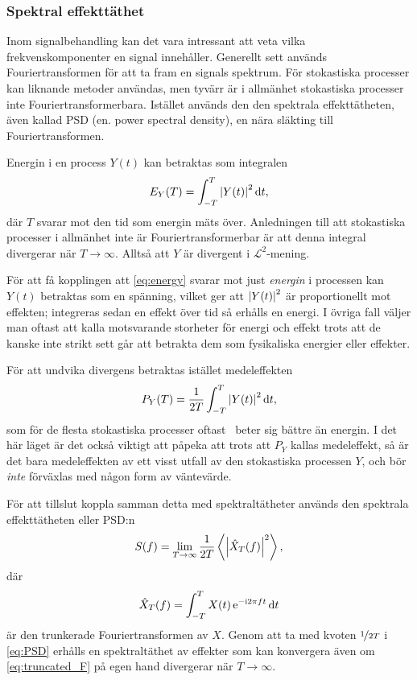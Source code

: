 \subsubsection{Spektral effekttäthet}
Inom signalbehandling kan det vara intressant att veta vilka frekvenskomponenter en signal innehåller. Generellt sett används Fouriertransformen för att ta fram en signals spektrum.
För stokastiska processer kan liknande metoder användas, men tyvärr är i allmänhet stokastiska processer inte Fouriertransformerbara. Istället används den den spektrala effekttätheten, även kallad PSD (en. power spectral density), en nära släkting till Fouriertransformen.

Energin i en process $Y(t)$ kan betraktas som integralen
\begin{equation}\label{eq:energy}
E_Y(T) = \int_{-T}^{T} \abs{Y(t)}^2\,\mathrm{d}{t},
\end{equation}
där $T$ svarar mot den tid som energin mäts över. Anledningen till att stokastiska processer i allmänhet inte är Fouriertransformerbar är att denna integral divergerar när $T\to\infty$. Alltså att $Y$ är divergent i $\mathcal{L}^2$-mening. 

För att få kopplingen att \eqref{eq:energy} svarar mot just \emph{energin} i processen kan $Y(t)$ betraktas som en spänning, vilket ger att $\abs{Y(t)}^2$ är proportionellt mot effekten; integreras sedan en effekt över tid så erhålls en energi. I övriga fall väljer man oftast att kalla motsvarande storheter för energi och effekt trots att de kanske inte strikt sett går att betrakta dem som fysikaliska energier eller effekter. 

För att undvika divergens betraktas istället medeleffekten 
\begin{equation}\label{eq:power}
P_Y(T) = \frac{1}{2T} \int_{-T}^{T} \abs{Y(t)}^2\,\mathrm{d}{t},
\end{equation}
som för de flesta stokastiska processer oftast~\cite{Miller_probability2012} beter sig bättre än energin.
I det här läget är det också viktigt att påpeka att trots att $P_Y$ kallas medeleffekt, så är det bara medeleffekten av ett visst utfall av den stokastiska processen $Y$, och bör \emph{inte} förväxlas med någon form av väntevärde. 

För att tillslut koppla samman detta med spektraltätheter används den spektrala effekttätheten eller PSD:n
\begin{equation}\label{eq:PSD}
S(f) =  \lim_{T\to\infty}\dfrac{1}{2T} \ev{\abs{\hat{X}_T(f)}^2},
\end{equation} 
där
\begin{equation}\label{eq:truncated_F}
\hat{X}_T(f) = \int_{-T}^{T} X(t)\,\mathrm{e}^{-\mathrm{i} 2\pi f t} \,\mathrm{d}{t}
\end{equation}
är den trunkerade Fouriertransformen av $X$. Genom att ta med kvoten $\nicefrac{1}{2T}$ i \eqref{eq:PSD} erhålls en spektraltäthet av effekter som kan konvergera även om \eqref{eq:truncated_F} på egen hand divergerar när $T\to\infty$. 


